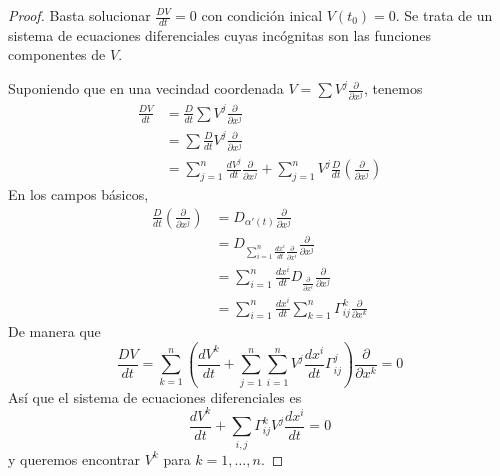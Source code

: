 \documentclass[spanish]{book}
\theoremstyle{definition}
\begin{document}
	\begin{proof}
		Basta solucionar $\frac{DV}{dt}=0$ con condición inical $V(t_0)=0$. Se trata de un sistema de ecuaciones diferenciales cuyas incógnitas son las funciones componentes de $V$.
		
		Suponiendo que en una vecindad coordenada $V=\sum V^j\frac{\partial}{\partial x^j}$, tenemos
		\begin{align*}
			\frac{DV}{dt}&=\frac{D}{dt}\sum V^j\frac{\partial}{\partial x^j}\\
			&=\sum\frac{D}{dt}V^j\frac{\partial}{\partial x^j}\\
			&=\sum_{j=1}^n\frac{dV^j}{dt}\frac{\partial}{\partial x^j}+\sum_{j=1}^nV^j\frac{D}{dt}\left(\frac{\partial}{\partial x^j}\right)
		\end{align*}
		En los campos básicos,
		\begin{align*}
			\frac{D}{dt}\left(\frac{\partial}{\partial x^j}\right)&=D_{\alpha'(t)}\frac{\partial}{\partial x^j}\\
			&=D_{\sum_{i=1}^n\frac{dx^i}{dt}\frac{\partial}{\partial x^i}}\frac{\partial}{\partial x^j}\\
			&=\sum_{i=1}^n\frac{dx^i}{dt}D_{\frac{\partial}{\partial x^i}}\frac{\partial}{\partial x^j}\\
			&=\sum_{i=1}^n\frac{dx^i}{dt}\sum_{k=1}^n\Gamma_{ij}^k\frac{\partial}{\partial x^k}
		\end{align*}
		De manera que
		\[\frac{DV}{dt}=\sum_{k=1}^n\left(\frac{dV^k}{dt}+\sum_{j=1}^n\sum_{i=1}^nV^j\frac{dx^i}{dt}\Gamma_{ij}^j\right)\frac{\partial}{\partial x^k}=0\]
		Así que el sistema de ecuaciones diferenciales es
		\[\frac{dV^k}{dt}+\sum_{i,j}\Gamma^k_{ij}V^j\frac{dx^i}{dt}=0\]
		y queremos encontrar $V^k$ para $k=1,\ldots,n$.
	\end{proof}
	
\end{document}
